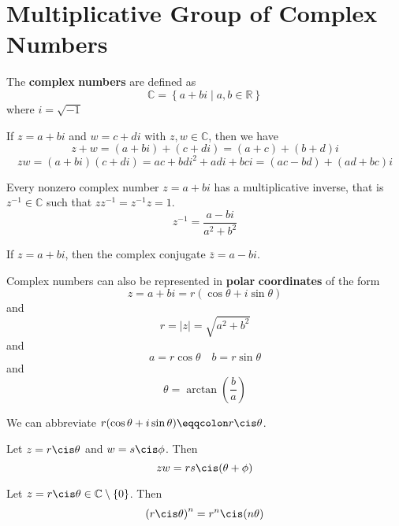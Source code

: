\documentclass[12pt, letterpaper]{report}
\begin{document}
\section{Multiplicative Group of Complex Numbers}
\begin{definition}
	The \textbf{complex} \textbf{numbers} are defined as
	\[
		\mathbb{C} =\left\{ a+bi\mid a,b\in\mathbb{R}  \right\} 
	\]
	where \(i=\sqrt{-1} \)
\end{definition}
\begin{definition}
	If \(z=a+bi\) and \(w=c+di\) with \(z,w\in\mathbb{C} \), then we have 
	\[
		z+w=(a+bi)+(c+di)=(a+c)+(b+d)i
	\]
	\[zw=(a+bi)(c+di)=ac+bdi^2 +adi+bci =(ac-bd)+(ad+bc)i\]
\end{definition}
Every nonzero complex number \(z=a+bi\) has a multiplicative inverse, that is \(z^{-1} \in\mathbb{C} \) such that \(zz^{-1}=z^{-1} z=1\).
\[
	z^{-1} =\frac{a-bi}{a^2 +b^2}
\]
\begin{definition}
	If \(z=a+bi\), then the complex conjugate \(\overline{z}=a-bi\).
\end{definition}
Complex numbers can also be represented in \textbf{polar} \textbf{coordinates} of the form 
\[
	z=a+bi=r(\cos \theta +i\sin \theta )
\]
and
\[r=|z| =\sqrt{a^2 +b^2} \]
and
\[
	a=r\cos \theta \quad b=r\sin \theta 
\]
and
\[
	\theta =\arctan\left( \frac{b}{a} \right)
\]
\begin{notation}
	We can abbreviate \(r(\cos \theta +i\sin \theta )\eqqcolon r\cis \theta \).
\end{notation}
\begin{proposition}
	Let \(z=r\cis \theta \) and \(w=s\cis \phi \). Then
	\[
		zw=rs\cis(\theta +\phi )
	\]
\end{proposition}
\begin{theorem}[DeMoivre]
	Let \(z=r\cis \theta \in\mathbb{C} \setminus \{ 0 \} \). Then 
	\[
		\left( r\cis \theta  \right) ^n =r^n \cis(n \theta )
	\]
\end{theorem}
\end{document}
